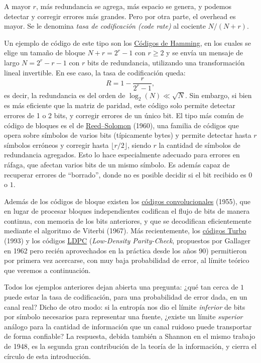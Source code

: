 A mayor $r$, más redundancia se agrega, más espacio se genera, y podemos detectar y corregir errores más grandes. Pero por otra parte, el overhead es mayor. Se le denomina \emph{tasa de codificación (code rate)} al cociente $N/(N+r)$.

Un ejemplo de código de este tipo son los \href{https://en.wikipedia.org/wiki/Hamming_code}{Códigos de Hamming}, en los cuales se elige un tamaño de bloque $N+r=2^{r}-1$ con $r\geqslant 2$ y se envía un mensaje de largo $N=2^{r} - r - 1$ con $r$ bits de redundancia, utilizando una transformación lineal invertible. En ese caso, la tasa de codificación queda:
\begin{equation*}
    R = 1-\frac{r}{2^r-1},
\end{equation*}
es decir, la redundancia es del orden de $\log_2(N)\ll \sqrt{N}$. Sin embargo, si bien es más eficiente que la matriz de paridad, este código solo permite detectar errores de 1 o 2 bits, y corregir errores de un único bit. El tipo más común de código de bloques es el de \href{https://en.wikipedia.org/wiki/Reed\%E2\%80\%93Solomon_error_correction}{Reed--Solomon} (1960), una familia de códigos que opera sobre símbolos de varios bits (típicamente bytes) y permite detectar hasta $r$ símbolos erróneos y corregir hasta $\lfloor r/2 \rfloor$, siendo $r$ la cantidad de símbolos de redundancia agregados. Esto lo hace especialmente adecuado para errores en ráfaga, que afectan varios bits de un mismo símbolo. Es además capaz de recuperar errores de ``borrado'', donde no es posible decidir si el bit recibido es $0$ o $1$.

Además de los códigos de bloque existen los \href{https://en.wikipedia.org/wiki/Convolutional_code}{códigos convolucionales} (1955), que en lugar de procesar bloques independientes codifican el flujo de bits de manera continua, con memoria de los bits anteriores, y que se decodifican eficientemente mediante el algoritmo de Viterbi (1967). Más recientemente, los \href{https://en.wikipedia.org/wiki/Turbo_code}{códigos Turbo} (1993) y los códigos \href{https://en.wikipedia.org/wiki/Low-density_parity-check_code}{LDPC} (\emph{Low-Density Parity-Check}, propuestos por Gallager en 1962 pero recién aprovechados en la práctica desde los años 90) permitieron por primera vez acercarse, con muy baja probabilidad de error, al límite teórico que veremos a continuación.

Todos los ejemplos anteriores dejan abierta una pregunta: ¿qué tan cerca de $1$ puede estar la tasa de codificación, para una probabilidad de error dada, en un canal real? Dicho de otro modo: si la entropía nos dio el límite \emph{inferior} de bits por símbolo necesarios para representar una fuente, ¿existe un límite \emph{superior} análogo para la cantidad de información que un canal ruidoso puede transportar de forma confiable? La respuesta, debida también a Shannon en el mismo trabajo de 1948, es la segunda gran contribución de la teoría de la información, y cierra el círculo de esta introducción.

